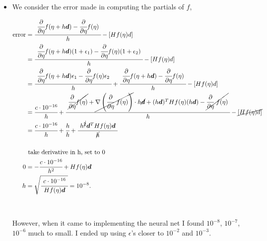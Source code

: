 \documentclass[]{article}
\begin{document}
~

\begin{itemize}     \item[] 

 We consider the error made in computing the partials of $f$,
 

 
 \begin{align*}
     \text{error} &= \cfrac{ \ \cfrac{\partial}{\partial \eta}  f(\eta + h {\bm d}) - 
         \cfrac{\partial}{\partial \eta}  f(\eta   ) \ }{ h} - \left[ Hf(\eta)d \right]\\
    &= \cfrac{ \ \cfrac{\partial}{\partial \eta}  f(\eta + h {\bm d}) (1+\epsilon_1) - 
         \cfrac{\partial}{\partial \eta}  f(\eta   ) (1+\epsilon_2) \ }{ h} - \left[ Hf(\eta)d \right] \\
    &= \cfrac{ \ \cfrac{\partial}{\partial \eta} f(\eta + h {\bm d} ) \epsilon_1 - 
        \cfrac{\partial}{\partial \eta} f(\eta) \epsilon_2 \ }{ h } + 
        \cfrac{ \ \cfrac{\partial}{\partial \eta} f(\eta + h {\bm d} )  - 
        \cfrac{\partial}{\partial \eta} f(\eta)   \ }{ h } - \left[ Hf(\eta)d \right] \\ 
    & =  \cfrac{c \cdot 10^{-16}}{h}  + \cfrac{ \ \cancel{  \cfrac{\partial}{\partial \eta} f(\eta)} +
         \cancel{  \nabla \left( \cfrac{\partial}{\partial \eta} \ f(\eta) \right) } \cdot h \cancel{{\bm d}}  +        (h{\bm d})^T Hf(\eta)  ( h {\bm d}) -     \cancel{    \cfrac{\partial}{\partial \eta} \ f(\eta)  }        \ }{h } - \cancel{ \left[ Hf(\eta)d \right]} \\
    &=     \cfrac{c \cdot 10^{-16}}{h} + \cfrac{h}{h} + \cfrac{ \ h^{\cancel{2}} {\bm d}^T Hf(\eta) {\bm d} \ }{\cancel{h}} \\
    \\
    & \text{ take derivative in h, set to 0} \\
    0 &= -  \cfrac{c \cdot 10^{-16}}{h^2} +Hf(\eta) {\bm d} \\
    h &= \sqrt{ \cfrac{ \ c \cdot 10^{-16}  \ }{ Hf(\eta) {\bm d}} }= 10^{-8}.
 \end{align*}
 
 \ 
 
 However, when it came to implementing the neural net I found $10^{-8}$, $10^{-7}$, $10^{-6}$ much to small. I ended up using $\epsilon$'s closer to $10^{-2}$ and $10^{-3}$.
 
  \end{itemize}

~
\end{document}
